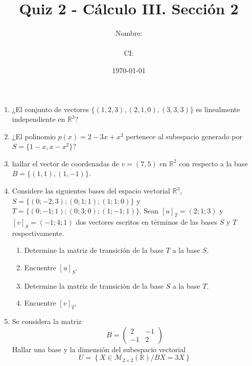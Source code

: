 \documentclass[12pt]{article}
\title{Quiz 2 - Cálculo III. Sección 2}
\author{Nombre: \rule{7cm}{0.4pt}  CI: \rule{5cm}{0.4pt}}
\date{\today}
\begin{document}
\maketitle

\begin{enumerate}
    \item ¿El conjunto de vectores $\{(1,2,3),(2,1,0),(3,3,3)\}$ es linealmente independiente en $\mathbb{R}^3$?
    \item ¿El polinomio $p(x)=2-3x+x^2$ pertenece al subespacio generado por $S=\{1-x,x-x^2\}$?
    \item hallar el vector de coordenadas de $v=(7,5)$ en $\mathbb{R}^2$ con respecto a la base $B=\{(1,1),(1,-1)\}$.
    \item Considere las siguientes bases del espacio vectorial $\mathbb{R}^3$, $S = \{(0;-2; 3); (0; 1; 1); (1; 1; 0)\}$ y $T = \{(0;-1; 1); (0; 3; 0); (1;-1; 1)\}$. Sean $[u]_T = (2; 1; 3)$ y $[v]_S = (-1; 4; 1)$ dos vectores escritos en términos de las bases $S$ y $T$ respectivamente.
    \begin{enumerate}
      \item Determine la matriz de transición de la base $T$ a la base $S$.
      \item Encuentre $[u]_S$. 
      \item Determine la matriz de transición de la base $S$ a la base $T$.
      \item Encuentre $[v]_T$.
  \end{enumerate}
  \item Se considera la matriz
  $$
  B=\begin{pmatrix}
    2 & -1\\
    -1 & 2    
  \end{pmatrix}
  $$
  Hallar una base y la dimensión del subespacio vectorial
  $$
  U = \left\{ X \in \mathcal{M}_{2\times2}(\mathbb{R}) / BX = 3X\right\}
  $$
\end{enumerate}
\end{document}

